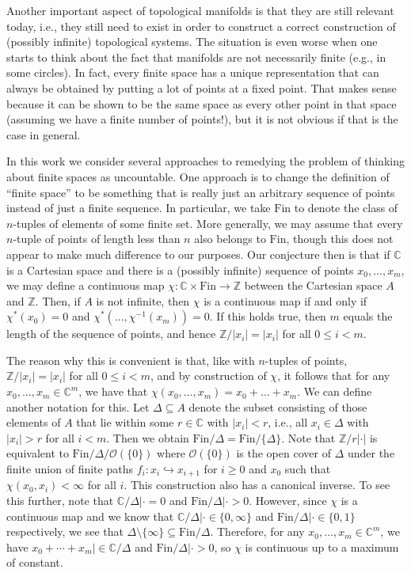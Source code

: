 \documentclass[a4paper,reqno,oneside]{article}
\begin{document}
Another important aspect of topological manifolds is that they are still relevant today, i.e., they still need to exist in order to construct a correct construction of (possibly infinite) topological systems. The situation is even worse when one starts to think about the fact that manifolds are not necessarily finite (e.g., in some circles). In fact, every finite space has a unique representation that can always be obtained by putting a lot of points at a fixed point. That makes sense because it can be shown to be the same space as every other point in that space (assuming we have a finite number of points!), but it is not obvious if that is the case in general. 

In this work we consider several approaches to remedying the problem of thinking about finite spaces as uncountable. One approach is to change the definition of ``finite space'' to be something that is really just an arbitrary sequence of points instead of just a finite sequence. In particular, we take $\text{Fin}$ to denote the class of $n$-tuples of elements of some finite set. More generally, we may assume that every $n$-tuple of points of length less than $n$ also belongs to $\text{Fin}$, though this does not appear to make much difference to our purposes. Our conjecture then is that if $\mathbb C$ is a Cartesian space and there is a (possibly infinite) sequence of points $x_0,\dots,x_{m}$, we may define a continuous map $\chi: \mathbb C\times \text{Fin}\to \mathbb Z$ between the Cartesian space $A$ and $\mathbb Z$. Then, if $A$ is not infinite, then $\chi$ is a continuous map if and only if $\chi^*(x_0)=0$ and $\chi^{*}(\dots,\chi^{-1}(x_{m}))=0$. If this holds true, then $m$ equals the length of the sequence of points, and hence $\mathbb Z/|x_{i}|=|x_i|$ for all $0\leq i<m$. 

The reason why this is convenient is that, like with $n$-tuples of points, $\mathbb Z/|x_{i}| = |x_i|$ for all $0\leq i<m$, and by construction of $\chi$, it follows that for any $x_0,\dots, x_m\in \mathbb C^m$, we have that $\chi(x_0,\dots,x_m)=x_0+\dots+x_m$. We can define another notation for this. Let $\Delta\subseteq A$ denote the subset consisting of those elements of $A$ that lie within some $r\in\mathbb C$ with $|x_i|<r$, i.e., all $x_i\in\Delta$ with $|x_i|>r$ for all $i<m$. Then we obtain $\text{Fin}/\Delta=\text{Fin}/\{\Delta\}$. Note that $\mathbb Z/r|\cdot|$ is equivalent to $\text{Fin}/{\Delta}/\mathcal{O}(\{0\})$ where $\mathcal{O}(\{0\})$ is the open cover of $\Delta$ under the finite union of finite paths $f_{i}:x_i\hookrightarrow x_{i+1}$ for $i\geq 0$ and $x_0$ such that $\chi(x_0,x_i)<\infty$ for all $i$. This construction also has a canonical inverse. To see this further, note that $\mathbb C/\Delta|\cdot=0$ and $\text{Fin}/\Delta|\cdot>0$. However, since $\chi$ is a continuous map and we know that $\mathbb C/\Delta|\cdot\in\{0,\infty\}$ and $\text{Fin}/\Delta|\cdot\in\{0,1\}$ respectively, we see that $\Delta\setminus \{\infty\}\subseteq \text{Fin}/\Delta$. Therefore, for any $x_0,\dots, x_m\in \mathbb C^m$, we have $x_0+\cdots+x_m|\in\mathbb C/\Delta$ and $\text{Fin}/\Delta|\cdot>0$, so $\chi$ is continuous up to a maximum of constant. 
\end{document}
